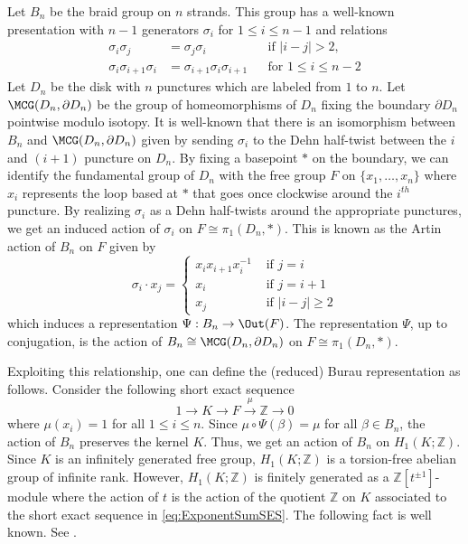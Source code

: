 \documentclass{amsart}
\begin{document}
Let $B_n$ be the braid group on $n$ strands. This group has a well-known presentation with $n-1$ generators $\sigma_i$ for $1\leq i \leq n-1$ and relations
\begin{align*}
    \sigma_i \sigma_j &= \sigma_j \sigma_i && \text{if } |i-j|>2, \\
    \sigma_i \sigma_{i+1} \sigma_i &= \sigma_{i+1}\sigma_i\sigma_{i+1} && \text{for } 1 \leq i \leq n-2
\end{align*}
Let $D_n$ be the disk with $n$ punctures which are labeled from $1$ to $n$. Let $\MCG(D_n,\partial D_n)$ be the group of homeomorphisms of $D_n$ fixing the boundary $\partial D_n$ pointwise modulo isotopy. It is well-known that there is an isomorphism between $B_n$ and $\MCG(D_n,\partial D_n)$ given by sending $\sigma_i$ to the Dehn half-twist between the $i$ and $(i+1)$ puncture on $D_n$. By fixing a basepoint $*$ on the boundary, we can identify the fundamental group of $D_n$ with the free group $F$ on $\{x_1,\dots,x_n\}$ where $x_i$ represents the loop based at $*$ that goes once clockwise around the $i^{th}$ puncture. By realizing $\sigma_i$ as a Dehn half-twists around the appropriate punctures, we get an induced action of $\sigma_i$ on $F \cong \pi_1(D_n,*)$. This is known as the Artin action of $B_n$ on $F$ given by 
\[
\sigma_i \cdot x_j =  
\begin{cases}
    x_ix_{i+1}x_i^{-1} & \text{ if } j = i \\
    x_{i} & \text{ if } j = i+1 \\
    x_j & \text{ if } |i-j| \geq 2
\end{cases}
\]
which induces a representation $\Psi:B_n \to \Out(F)$. The representation $\Psi$, up to conjugation, is the action of $B_n \cong \MCG(D_n,\partial D_n)$ on $F \cong \pi_1(D_n,*)$. 

Exploiting this relationship, one can define the (reduced) Burau representation as follows. Consider the following short exact sequence
\begin{equation}\label{eq:ExponentSumSES}
    1 \to K \to F \xrightarrow{\mu} \mathbb{Z} \to 0
\end{equation}
where $\mu(x_i)=1$ for all $1\leq i \leq n$. Since $\mu \circ \Psi(\beta) = \mu$ for all $\beta \in B_n$, the action of $B_n$ preserves the kernel $K$. Thus, we get an action of $B_n$ on $H_1(K;\mathbb{Z})$. Since $K$ is an infinitely generated free group, $H_1(K;\mathbb{Z})$ is a torsion-free abelian group of infinite rank. However, $H_1(K;\mathbb{Z})$ is finitely generated as a $\mathbb{Z}[t^{\pm 1}]$-module where the action of  $t$ is the action of the quotient $\mathbb{Z}$ on $K$ associated to the short exact sequence in \cref{eq:ExponentSumSES}. The following fact is well known. See \cite[Remark 3.11]{kasselturaev08braid}. 
\end{document}
